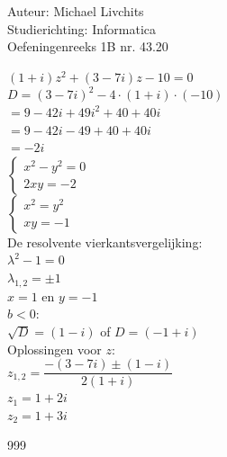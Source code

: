 \documentclass[a4paper]{article}
\begin{document}
  
\noindent \large Auteur: Michael Livchits \\
\noindent \large Studierichting: Informatica\\
\noindent \large Oefeningenreeks 1B nr. 43.20\\

\medskip

\normalsize

$(1+i)z^2 + (3-7i)z - 10 = 0$\\

$D = (3-7i)^2 - 4\cdot(1+i)\cdot(-10)$\\

$= 9 - 42i + 49i^2 + 40 + 40i$\\

$= 9 - 42i - 49 + 40 + 40i$\\

$= -2i$\\

$\left\{
\begin{array}{l}
	x^2-y^2 = 0 \\
	2xy = -2
\end{array}
\right .$\\

$\left\{
\begin{array}{l}
	x^2 = y^2 \\
	xy = -1
\end{array}
\right .$\\

De resolvente vierkantsvergelijking: \\

$\lambda^2 -1 = 0 $\\

$\lambda_{1,2} = \pm1 $\\

$x = 1$ en $y = -1$\\

$ b < 0 $:\\

$\sqrt{D} = \left(1 - i\right) $ of $D = \left(-1 + i\right) $ \\

Oplossingen voor $z$: \\

$z_{1,2} = \dfrac{-(3-7i)\pm(1-i)}{2(1+i)}$\\

$z_{1} = 1 + 2i$\\

$z_{2} = 1 + 3i$\\


\begin{thebibliography}{999}
\end{thebibliography}
\end{document}
